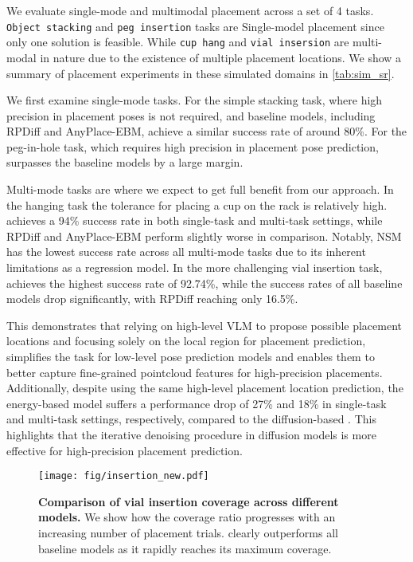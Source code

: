 We evaluate single-mode and multimodal placement across a set of 4 tasks. 
\texttt{Object stacking} and \texttt{peg insertion} tasks are Single-model placement since only one solution is feasible. While \texttt{cup hang} and \texttt{vial insersion} are multi-modal in nature due to the existence of multiple placement locations. We show a summary of placement experiments in these simulated domains in  \autoref{tab:sim_sr}.


We first examine single-mode tasks. 
For the simple stacking task, where high precision in placement poses is not required, \ourmethod and baseline models, including RPDiff and AnyPlace-EBM, achieve a similar success rate of around 80\%.
For the peg-in-hole task, which requires high precision in placement pose prediction, \ourmethod surpasses the baseline models by a large margin. 

Multi-mode tasks are where we expect to get full benefit from our approach.
In the hanging task the tolerance for placing a cup on the rack is relatively high. \ourmethod achieves a 94\% success rate in both single-task and multi-task settings, while RPDiff and AnyPlace-EBM perform slightly worse in comparison. Notably, NSM has the lowest success rate across all multi-mode tasks due to its inherent limitations as a regression model.
In the more challenging vial insertion task, \ourmethod achieves the highest success rate of 92.74\%, while the success rates of all baseline models drop significantly, with RPDiff reaching only 16.5\%.

This demonstrates that relying on high-level VLM to propose possible placement locations and focusing solely on the local region for placement prediction, simplifies the task for low-level pose prediction models and enables them to better capture fine-grained pointcloud features for high-precision placements. Additionally, despite using the same high-level placement location prediction, the energy-based model suffers a performance drop of 27\% and 18\% in single-task and multi-task settings, respectively, compared to the diffusion-based \ourmethod. This highlights that the iterative denoising procedure in diffusion models is more effective for high-precision placement prediction.



\begin{figure}[!t]
    \centering
    \texttt{[image: fig/insertion\_new.pdf]}
    \caption{\textbf{Comparison of vial insertion coverage across different models.} We show how the coverage ratio progresses with an increasing number of placement trials. \ourmethod clearly outperforms all baseline models as it rapidly reaches its maximum coverage.
    }
    \label{fig:vialinsertion_coverage}
\end{figure}








